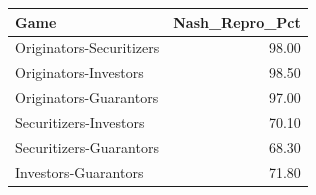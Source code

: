 \begin{tabular}{lr}
\toprule
Game & Nash_Repro_Pct \\
\midrule
Originators-Securitizers & 98.00 \\
Originators-Investors & 98.50 \\
Originators-Guarantors & 97.00 \\
Securitizers-Investors & 70.10 \\
Securitizers-Guarantors & 68.30 \\
Investors-Guarantors & 71.80 \\
\bottomrule
\end{tabular}
